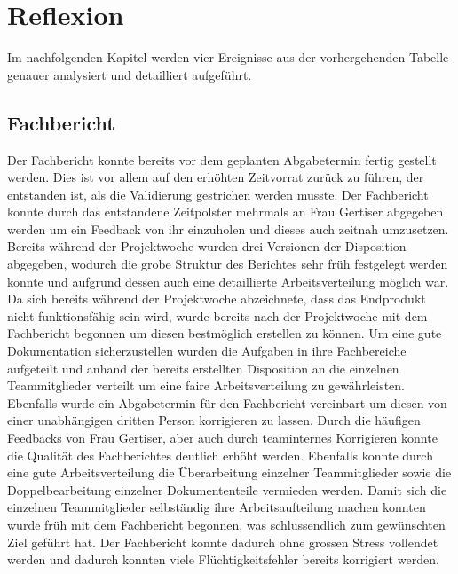 \section{Reflexion}
Im nachfolgenden Kapitel werden vier Ereignisse aus der vorhergehenden Tabelle genauer analysiert und detailliert aufgeführt.

\subsection{Fachbericht}

Der Fachbericht konnte bereits vor dem geplanten Abgabetermin fertig gestellt werden. Dies ist vor allem auf den erhöhten Zeitvorrat zurück zu führen, der entstanden ist, als die Validierung gestrichen werden musste.  Der Fachbericht konnte durch das entstandene Zeitpolster mehrmals an Frau Gertiser abgegeben werden um ein Feedback von ihr einzuholen und dieses auch zeitnah umzusetzen. \newline
Bereits während der Projektwoche wurden drei Versionen der Disposition abgegeben, wodurch die grobe Struktur des Berichtes sehr früh festgelegt werden konnte und aufgrund dessen auch eine detaillierte Arbeitsverteilung möglich war. \newline
Da sich bereits während der Projektwoche abzeichnete, dass das Endprodukt nicht funktionsfähig sein wird, wurde bereits nach der Projektwoche mit dem Fachbericht begonnen um diesen bestmöglich erstellen zu können. \newline
Um eine gute Dokumentation sicherzustellen wurden die Aufgaben in ihre Fachbereiche aufgeteilt und anhand der bereits erstellten Disposition an die einzelnen Teammitglieder verteilt um eine faire Arbeitsverteilung zu gewährleisten. Ebenfalls wurde ein Abgabetermin für den Fachbericht vereinbart um diesen von einer unabhängigen dritten Person korrigieren zu lassen.\newline
Durch die häufigen Feedbacks von Frau Gertiser, aber auch durch teaminternes Korrigieren konnte die Qualität des Fachberichtes deutlich erhöht werden. Ebenfalls konnte durch eine gute Arbeitsverteilung die Überarbeitung einzelner Teammitglieder sowie die Doppelbearbeitung einzelner Dokumententeile vermieden werden. \newline
Damit sich die einzelnen Teammitglieder selbständig ihre Arbeitsaufteilung machen konnten wurde früh mit dem Fachbericht begonnen, was schlussendlich zum gewünschten Ziel geführt hat. Der Fachbericht konnte dadurch ohne grossen Stress vollendet werden und dadurch konnten viele Flüchtigkeitsfehler bereits korrigiert werden.
\newpage

